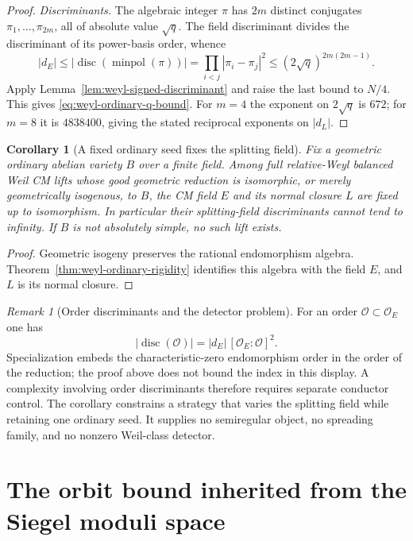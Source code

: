 \documentclass[11pt]{article}
\newtheorem{corollary}[theorem]{Corollary}
\theoremstyle{definition}
\theoremstyle{remark}
\newtheorem{remark}[theorem]{Remark}
\begin{document}
\begin{proof}
\emph{Discriminants.}
The algebraic integer $\pi$ has $2m$ distinct conjugates
$\pi_1,\ldots,\pi_{2m}$, all of absolute value $\sqrt q$.
The field discriminant divides the discriminant of its power-basis
order, whence
\[
 |d_E|
 \leq\left|\operatorname{disc}(\operatorname{minpol}(\pi))\right|
 =\prod_{i<j}|\pi_i-\pi_j|^2
 \leq(2\sqrt q)^{2m(2m-1)}.
\]
Apply Lemma~\ref{lem:weyl-signed-discriminant} and raise the last
bound to $N/4$.  This gives
\eqref{eq:weyl-ordinary-q-bound}.  For $m=4$ the exponent on
$2\sqrt q$ is $672$; for $m=8$ it is $4838400$, giving the stated
reciprocal exponents on $|d_L|$.
\end{proof}

\begin{corollary}[A fixed ordinary seed fixes the splitting field]
\label{cor:weyl-fixed-ordinary-seed}
Fix a geometric ordinary abelian variety $B$ over a finite field.
Among full relative-Weyl balanced Weil CM lifts whose good
geometric reduction is isomorphic, or merely geometrically
isogenous, to $B$, the CM field $E$ and its normal closure $L$ are
fixed up to isomorphism.  In particular their splitting-field
discriminants cannot tend to infinity.
If $B$ is not absolutely simple, no such lift exists.
\end{corollary}

\begin{proof}
Geometric isogeny preserves the rational endomorphism algebra.
Theorem~\ref{thm:weyl-ordinary-rigidity} identifies this algebra
with the field $E$, and $L$ is its normal closure.
\end{proof}

\begin{remark}[Order discriminants and the detector problem]
\label{rem:weyl-order-scope}
For an order $\mathcal O\subset\mathcal O_E$ one has
\[
 |\operatorname{disc}(\mathcal O)|
 =|d_E|\,[\mathcal O_E:\mathcal O]^2.
\]
Specialization embeds the characteristic-zero endomorphism order
in the order of the reduction; the proof above does not bound the
index in this display.  A complexity involving order
discriminants therefore requires separate conductor control.
The corollary constrains a strategy that varies the splitting field
while retaining one ordinary seed.  It supplies no semiregular
object, no spreading family, and no nonzero Weil-class detector.
\end{remark}

\section{The orbit bound inherited from the Siegel moduli space}
\label{sec:orbit-transfer}
\end{document}
